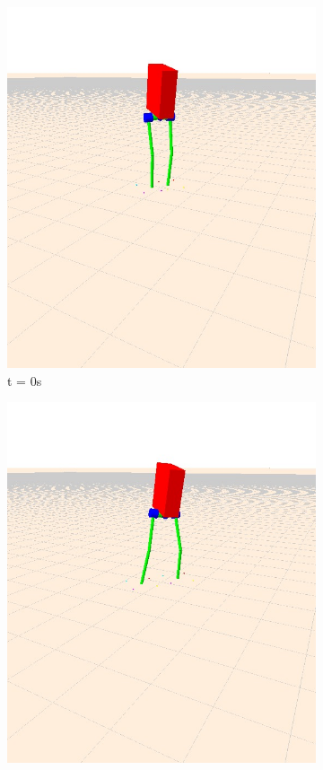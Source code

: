 \documentclass[letterpaper, 10 pt, conference]{ieeeconf}  %
\begin{document}
\begin{figure}[tbp]
  \centering
  \begin{subfigure}[b]{0.3\textwidth}
    \centering
    \includegraphics[width=\textwidth] {figures/balanceNoYaw1.jpg}
    \caption{t = 0s}
    \label{fig:balanceNoYaw1}
  \end{subfigure}\hfill
  \begin{subfigure}[b]{0.3\textwidth}
    \centering
    \includegraphics[width=\textwidth] {figures/balanceNoYaw2.jpg} 

\end{subfigure}
\end{figure}
\end{document}
